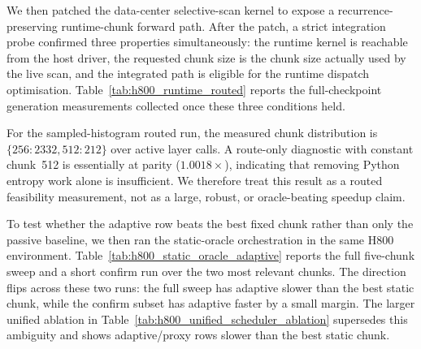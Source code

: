 We then patched the data-center selective-scan kernel to expose a recurrence-preserving runtime-chunk forward path. After the patch, a strict integration probe confirmed three properties simultaneously: the runtime kernel is reachable from the host driver, the requested chunk size is the chunk size actually used by the live scan, and the integrated path is eligible for the runtime dispatch optimisation. Table~\ref{tab:h800_runtime_routed} reports the full-checkpoint generation measurements collected once these three conditions held.

\begin{table}[h]
\centering
\caption{Data-center accelerator runtime-chunk routed live-scan measurements (Mamba-370M, NVIDIA H800 PCIe, CUDA~12.8, PyTorch~2.8.0, 32 new tokens; runtime chunk dispatch routed through the patched recurrence-preserving live scan). The full-histogram scheduler routes into the live scan kernel but is negative; the sampled histogram with stride~8 lowers scheduler cost in this passive-baseline comparison, while the unified static-oracle ablation in Table~\ref{tab:h800_unified_scheduler_ablation} remains negative.}
\label{tab:h800_runtime_routed}
\small
{}
\end{table}

For the sampled-histogram routed run, the measured chunk distribution is $\{256{:}2332,512{:}212\}$ over active layer calls. A route-only diagnostic with constant chunk~512 is essentially at parity ($1.0018\times$), indicating that removing Python entropy work alone is insufficient. We therefore treat this result as a routed feasibility measurement, not as a large, robust, or oracle-beating speedup claim.

To test whether the adaptive row beats the best fixed chunk rather than only the passive baseline, we then ran the static-oracle orchestration in the same H800 environment. Table~\ref{tab:h800_static_oracle_adaptive} reports the full five-chunk sweep and a short confirm run over the two most relevant chunks. The direction flips across these two runs: the full sweep has adaptive slower than the best static chunk, while the confirm subset has adaptive faster by a small margin. The larger unified ablation in Table~\ref{tab:h800_unified_scheduler_ablation} supersedes this ambiguity and shows adaptive/proxy rows slower than the best static chunk.

